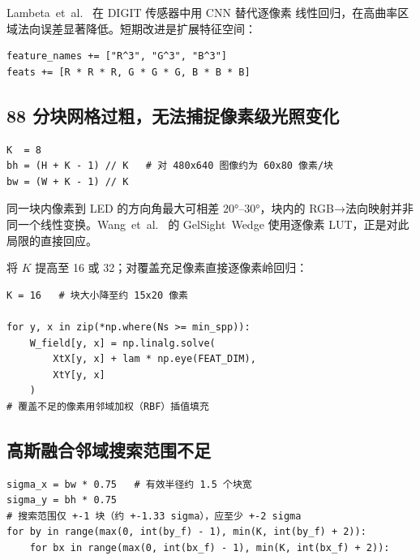 Lambeta~et~al.~\cite{lambeta2020digit} 在 DIGIT 传感器中用 CNN 替代逐像素
线性回归，在高曲率区域法向误差显著降低。短期改进是扩展特征空间：

\begin{lstlisting}[caption={短期改进：追加三阶单项式}]
feature_names += ["R^3", "G^3", "B^3"]
feats += [R * R * R, G * G * G, B * B * B]
\end{lstlisting}

\subsection{8{\texttimes}8 分块网格过粗，无法捕捉像素级光照变化}
\label{subsec:block_grid}

\begin{lstlisting}[caption={硬编码的 8x8 分块（ball\_calibrate.py 第 1066 行）}]
K  = 8
bh = (H + K - 1) // K   # 对 480x640 图像约为 60x80 像素/块
bw = (W + K - 1) // K
\end{lstlisting}

同一块内像素到 LED 的方向角最大可相差 $20°$--$30°$，块内的 RGB→法向映射并非
同一个线性变换。Wang~et~al.~\cite{wang2021gelsightwedge} 的 GelSight~Wedge
使用逐像素 LUT，正是对此局限的直接回应。

\begin{fixbox}
将 $K$ 提高至 16 或 32；对覆盖充足像素直接逐像素岭回归：

\begin{lstlisting}
K = 16   # 块大小降至约 15x20 像素

for y, x in zip(*np.where(Ns >= min_spp)):
    W_field[y, x] = np.linalg.solve(
        XtX[y, x] + lam * np.eye(FEAT_DIM),
        XtY[y, x]
    )
# 覆盖不足的像素用邻域加权（RBF）插值填充
\end{lstlisting}
\end{fixbox}

\subsection{高斯融合邻域搜索范围不足}
\label{subsec:gaussian_blend}

\begin{lstlisting}[caption={sigma 与搜索范围不匹配（ball\_calibrate.py 第 1113 行）}]
sigma_x = bw * 0.75   # 有效半径约 1.5 个块宽
sigma_y = bh * 0.75
# 搜索范围仅 +-1 块（约 +-1.33 sigma），应至少 +-2 sigma
for by in range(max(0, int(by_f) - 1), min(K, int(by_f) + 2)):
    for bx in range(max(0, int(bx_f) - 1), min(K, int(bx_f) + 2)):
\end{lstlisting}

